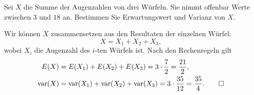 Sei $X$ die Summe der Augenzahlen von drei Würfeln.
Sie nimmt offenbar Werte zwischen $3$ und $18$ an. Bestimmen
Sie Erwartungswert und Varianz von $X$.

\begin{loesung}
Wir können $X$ zusammensetzen aus den Resultaten der einzelnen
Würfel:
\[
X=X_1+X_2+X_3,
\]
wobei $X_i$ die Augenzahl des $i$-ten Würfels ist.
Nach den Rechenregeln gilt
\begin{align*}
E(X)&=E(X_1)+E(X_2)+E(X_3)=3\cdot\frac72=\frac{21}{2},\\
\operatorname{var}(X)&=
\operatorname{var}(X_1)+
\operatorname{var}(X_2)+
\operatorname{var}(X_3)=3\cdot \frac{35}{12}=\frac{35}{4}.
\qedhere
\end{align*}
\end{loesung}


